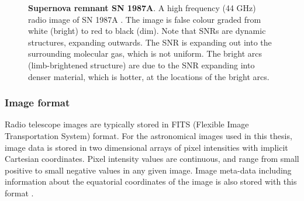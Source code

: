 \begin{figure}
\centering
{}
\caption[Supernova remnant]{\textbf{Supernova remnant SN 1987A}. A high frequency (44 GHz) radio image of SN 1987A \cite{zanardo2013high}. The image is false colour graded from white (bright) to red to black (dim). Note that SNRs are dynamic structures, expanding outwards. The SNR is expanding out into the surrounding molecular gas, which is not uniform. The bright arcs (limb-brightened structure) are due to the SNR expanding into denser material, which is hotter, at the locations of the bright arcs.}
\label{fig:snr}
\end{figure}


\subsubsection{Image format}

Radio telescope images are typically stored in FITS (Flexible Image Transportation System) format. For the astronomical images used in this thesis, image data is stored in two dimensional arrays of pixel intensities with implicit Cartesian coordinates. Pixel intensity values are continuous, and range from small positive to small negative values in any given image. Image meta-data including information about the equatorial coordinates of the image is also stored with this format \cite{wells1981fits}. 

